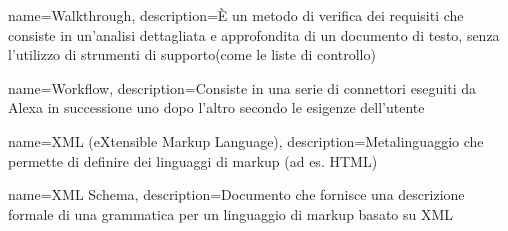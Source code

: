 {
name={Walkthrough},
description={È un metodo di verifica dei requisiti che consiste in un'analisi dettagliata e approfondita di un documento di testo, senza l'utilizzo di strumenti di supporto(come le liste di controllo)}
}

{
name={Workflow},
description={Consiste in una serie di connettori eseguiti da Alexa in successione uno dopo l'altro secondo le esigenze dell'utente }
}

{
	name={XML (eXtensible Markup Language)},
	description={Metalinguaggio che permette di definire dei linguaggi di markup (ad es. HTML)}
}

{
	name={XML Schema},
	description={Documento che fornisce una descrizione formale di una grammatica per un linguaggio di markup basato su XML}
}